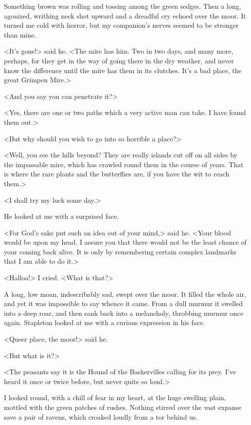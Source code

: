 Something brown was rolling and tossing among the green sedges. Then a long, agonized, writhing neck shot upward and a dreadful cry echoed over the moor. It turned me cold with horror, but my companion's nerves seemed to be stronger than mine.

<It's gone!> said he. <The mire has him. Two in two days, and many more, perhaps, for they get in the way of going there in the dry weather, and never know the difference until the mire has them in its clutches. It's a bad place, the great Grimpen Mire.>

<And you say you can penetrate it?>

<Yes, there are one or two paths which a very active man can take. I have found them out.>



<But why should you wish to go into so horrible a place?>

<Well, you see the hills beyond? They are really islands cut off on all sides by the impassable mire, which has crawled round them in the course of years. That is where the rare plants and the butterflies are, if you have the wit to reach them.>

<I shall try my luck some day.>

He looked at me with a surprised face.

<For God's sake put such an idea out of your mind,> said he. <Your blood would be upon my head. I assure you that there would not be the least chance of your coming back alive. It is only by remembering certain complex landmarks that I am able to do it.>

<Halloa!> I cried. <What is that?>

A long, low moan, indescribably sad, swept over the moor. It filled the whole air, and yet it was impossible to say whence it came. From a dull murmur it swelled into a deep roar, and then sank back into a melancholy, throbbing murmur once again. Stapleton looked at me with a curious expression in his face.

<Queer place, the moor!> said he.

<But what is it?>

<The peasants say it is the Hound of the Baskervilles calling for its prey. I've heard it once or twice before, but never quite so loud.>

I looked round, with a chill of fear in my heart, at the huge swelling plain, mottled with the green patches of rushes. Nothing stirred over the vast expanse save a pair of ravens, which croaked loudly from a tor behind us.

